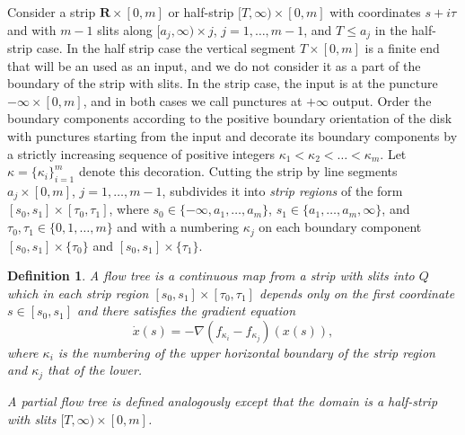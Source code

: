 \documentclass{gtpart}
\newtheorem{defi}[thm]{Definition}
\renewcommand{\R}{\mathbf{R}}
\begin{document}
Consider a strip $\R\times[0,m]$ or half-strip $[T,\infty)\times[0,m]$ with coordinates $s+i\tau$ and with $m-1$ slits
along $[a_{j},\infty)\times j$, $j=1,\dots, m-1$, and $T\le a_{j}$ in the half-strip case. In the
half strip case the vertical segment $T\times[0,m]$ is a finite end that will be an used as an input,
and we do not consider it as a part of the boundary of the strip with slits. In the strip case, the
input is at the puncture $-\infty\times[0,m]$, and in both cases we call punctures at $+\infty$
output. Order the boundary components according to the positive boundary orientation of the disk
with punctures starting from the input and decorate its boundary components by a strictly increasing
sequence of positive integers $\kappa_1<\kappa_2<\ldots<\kappa_{m}$. Let $\kappa = \{\kappa_i
\}_{i=1}^{m}$ denote this decoration. Cutting the strip by line segments $a_j
\times [0,m]$, $j=1,\dots,m-1$, subdivides it into \emph{strip regions} of the form
$[s_{0},s_{1}]\times[\tau_{0},\tau_{1}]$, where $s_{0}\in\{-\infty, a_{1},\dots,a_{m}\}$,
$s_{1}\in\{a_{1},\dots,a_{m},\infty\}$, and $\tau_{0},\tau_{1}\in\{0,1,\dots,m\}$ and with a
numbering $\kappa_{j}$ on each boundary component $[s_{0},s_{1}]\times\{\tau_{0}\}$ and
$[s_{0},s_{1}]\times\{\tau_{1}\}$. 

\begin{defi}
A flow tree is a continuous map from a strip with slits into $Q$ which in each strip region
    $[s_{0},s_{1}]\times [\tau_{0},\tau_{1}]$ depends only on the first coordinate $s\in[s_{0},s_{1}]$ and there satisfies the gradient equation 
\[
\dot x(s) =-\nabla (f_{\kappa_{i}}-f_{\kappa_{j}})(x(s)),
\]
where $\kappa_{i}$ is the numbering of the upper horizontal boundary of the strip region and $\kappa_{j}$ that of the lower.

A partial flow tree is defined analogously except that the domain is a half-strip with slits $[T,\infty)\times [0,m]$. 	
\end{defi}
\end{document}
